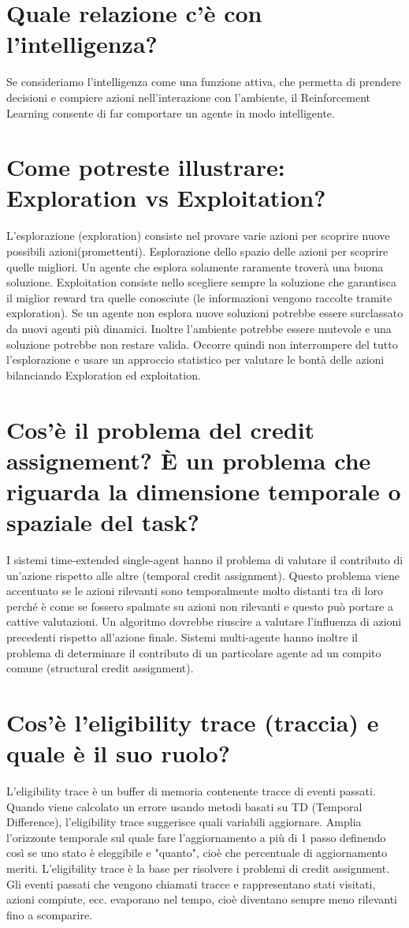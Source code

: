 \documentclass[\main/main.tex]{subfiles}
\begin{document}
\section{Quale relazione c'è con l'intelligenza?}
Se consideriamo l’intelligenza come una funzione attiva, che permetta di prendere decisioni e compiere azioni nell’interazione con l’ambiente, il Reinforcement Learning consente di far comportare un agente in modo intelligente.

\section{Come potreste illustrare: Exploration vs Exploitation?}
L'esplorazione (exploration) consiste nel provare varie azioni per scoprire nuove possibili azioni(promettenti). Esplorazione dello spazio delle azioni per scoprire quelle migliori.
Un agente che esplora solamente raramente troverà una buona soluzione.
Exploitation consiste nello scegliere sempre la soluzione che garantisca il miglior reward tra quelle conosciute (le informazioni vengono raccolte tramite exploration).
Se un agente non esplora nuove soluzioni potrebbe essere surclassato da nuovi agenti più dinamici. Inoltre l'ambiente potrebbe essere mutevole e una soluzione potrebbe non restare valida. Occorre quindi non interrompere del tutto l'esplorazione e usare un approccio statistico per valutare le bontà delle azioni bilanciando Exploration ed exploitation.


\section{Cos'è il problema del credit assignement? È un problema che riguarda la dimensione temporale o spaziale del task?}
I sistemi time-extended single-agent hanno il problema di valutare il contributo di un'azione rispetto alle altre (temporal credit assignment).
Questo problema viene accentuato se le azioni rilevanti sono temporalmente molto distanti tra di loro perché è come se fossero spalmate su azioni non rilevanti e questo può portare a cattive valutazioni. Un algoritmo dovrebbe riuscire a valutare l'influenza di azioni precedenti rispetto all'azione finale.
Sistemi multi-agente hanno inoltre il problema di determinare il contributo di un particolare agente ad un compito comune (structural credit assignment).

\section{Cos'è l'eligibility trace (traccia) e quale è il suo ruolo?}
L'eligibility trace è un buffer di memoria contenente tracce di eventi passati.
Quando viene calcolato un errore usando metodi basati su TD (Temporal Difference), l'eligibility trace suggerisce quali variabili aggiornare.
Amplia l’orizzonte temporale sul quale fare l’aggiornamento a più di 1 passo definendo così se uno stato è eleggibile e "quanto", cioè che percentuale di aggiornamento meriti. 
L'eligibility trace è la base per risolvere i problemi di credit assignment.
Gli eventi passati che vengono chiamati tracce e rappresentano stati visitati, azioni compiute, ecc. evaporano nel tempo, cioè diventano sempre meno rilevanti fino a scomparire.
\end{document}
